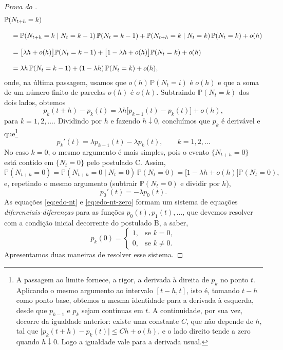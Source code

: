 \documentclass[12pt,portuguese]{article}
\theoremstyle{definition}
\theoremstyle{plainexercise}
\theoremstyle{starredexercise}
\theoremstyle{definition}
\begin{document}
\begin{proof}[Prova do ]
\begin{align}
  \mathbb{P}(&N_{t+h}=k)
  \notag\\[0.3cm]
  &=\mathbb{P}(N_{t+h}=k\mid N_t=k-1)\,\mathbb{P}(N_t=k-1)
    \notag
  +\mathbb{P}(N_{t+h}=k\mid N_t=k)\,\mathbb{P}(N_t=k)+o(h)
    \notag
  \\[0.3cm]
  &=\bigl[\lambda h+o(h)\bigr]\mathbb{P}(N_t=k-1)
    +\bigl[1-\lambda h+o(h)\bigr]\mathbb{P}(N_t=k)+o(h)
    \notag
  \\[0.3cm]
  &=\lambda h\,\mathbb{P}(N_t=k-1)
    +(1-\lambda h)\,\mathbb{P}(N_t=k)+o(h),
    \label{eq:sistema-recursivo}
\end{align}
onde, na última passagem, usamos que $o(h)\,\mathbb{P}(N_t=i)$ é $o(h)$ e que
a soma de um número finito de parcelas $o(h)$ é $o(h)$. Subtraindo
$\mathbb{P}(N_t=k)$ dos dois lados, obtemos
\[
  p_k(t+h)-p_k(t)=\lambda h\bigl[p_{k-1}(t)-p_k(t)\bigr]+o(h),
\]
para $k=1,2,\ldots$. Dividindo por $h$ e fazendo $h\downarrow0$, concluímos
que $p_k$ é derivável e que\footnote{A passagem ao limite fornece, a rigor, a
derivada à direita de $p_k$ no ponto $t$. Aplicando o mesmo argumento ao
intervalo $[t-h,t]$, isto é, tomando $t-h$ como ponto base, obtemos a mesma
identidade para a derivada à esquerda, desde que $p_{k-1}$ e $p_k$ sejam
contínuas em $t$. A continuidade, por sua vez, decorre da igualdade anterior:
existe uma constante $C$, que não depende de $h$, tal que
$\bigl|p_k(t+h)-p_k(t)\bigr|\leqslant Ch+o(h)$, e o lado direito tende a zero
quando $h\downarrow0$. Logo a igualdade vale para a derivada usual.}
\begin{equation}\label{eq:edo-nt}
  p_k'(t)=\lambda p_{k-1}(t)-\lambda p_k(t),
  \qquad k=1,2,\ldots
\end{equation}
No caso $k=0$, o mesmo argumento é mais simples, pois o evento
$\{N_{t+h}=0\}$ está contido em $\{N_t=0\}$ pelo postulado C. Assim,
\[
  \mathbb{P}(N_{t+h}=0)
  =\mathbb{P}(N_{t+h}=0\mid N_t=0)\,\mathbb{P}(N_t=0)
  =\bigl[1-\lambda h+o(h)\bigr]\mathbb{P}(N_t=0),
\]
e, repetindo o mesmo argumento (subtrair $\mathbb{P}(N_t=0)$ e dividir por
$h$),
\begin{equation}\label{eq:edo-nt-zero}
  p_0'(t)=-\lambda p_0(t).
\end{equation}
As equações \eqref{eq:edo-nt} e \eqref{eq:edo-nt-zero} formam um sistema de
equações \emph{diferenciais-diferenças} para as funções
$p_0(t),p_1(t),\ldots$, que devemos resolver com a condição inicial
decorrente do postulado B, a saber,
\begin{equation}\label{eq:condicao-inicial-nt}
  p_k(0)=
  \begin{cases}
    1, & \text{se } k=0,
    \\[0.2cm]
    0, & \text{se } k\neq0.
  \end{cases}
\end{equation}
Apresentamos duas maneiras de resolver esse sistema.


\end{proof}
\end{document}
